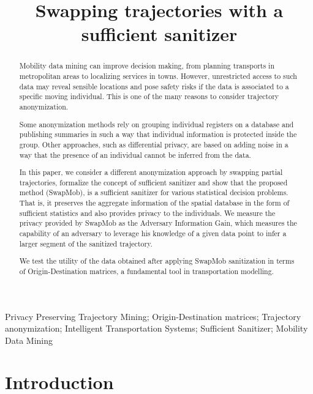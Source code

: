 \documentclass[review]{elsarticle}
\begin{document}
\title{Swapping trajectories with a sufficient sanitizer}

\begin{abstract}

Mobility data mining can improve decision making, from planning transports in metropolitan areas to localizing services in towns.
However, unrestricted access to such data may reveal sensible locations and pose safety risks if the data is associated to a specific moving individual. This is one of the many reasons to consider trajectory anonymization.


Some anonymization methods rely on grouping individual registers on a database and publishing summaries in such a way that individual information is protected inside the group.
Other approaches, such as differential privacy, are based on adding noise in a way that the presence of an individual cannot be inferred from the data.


In this paper, we consider a different anonymization approach by swapping partial trajectories, formalize the concept of sufficient sanitizer and show that the proposed method (SwapMob), is a sufficient sanitizer for various statistical decision problems. That is, it preserves the aggregate information of the spatial database in the form of sufficient statistics and also provides privacy to the individuals. 
We measure the privacy provided by SwapMob as the Adversary Information Gain, which measures the capability of an adversary to leverage his knowledge of a given data point to infer a larger segment of the sanitized trajectory.

We test the utility of the data obtained after applying SwapMob sanitization in terms of Origin-Destination matrices, a fundamental tool in  transportation modelling.

\end{abstract}


\begin{keyword}
 Privacy Preserving Trajectory Mining;
 Origin-Destination matrices; 
 Trajectory anonymization;
 Intelligent Transportation Systems; 
 Sufficient Sanitizer; 
 Mobility Data Mining
\end{keyword}


\maketitle

\section{Introduction}
\end{document}
